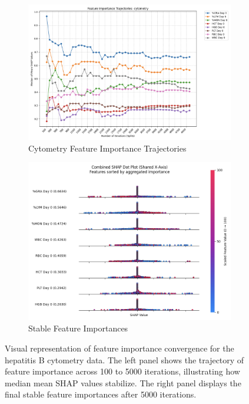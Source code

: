 \documentclass[12pt,a4paper]{report}
\begin{document}
\begin{figure}[h!]
    \centering
    
    \begin{subfigure}[b]{0.48\textwidth}
    \centering
    \includegraphics[width=\textwidth]{images/trajectory_cytometry_hepatitis.png}
    \caption{Cytometry Feature Importance Trajectories}
    \label{fig:trajectory_cytometry_hepatitis}
    \end{subfigure}
    \hfill
    \begin{subfigure}[b]{0.48\textwidth}
    \centering
    \includegraphics[width=\textwidth]{images/stable_features_cytometry_hepatitis.png}
    \caption{Stable Feature Importances}
    \label{fig:stable_features_cytometry_hepatitis}
    \end{subfigure}
    
    \caption[Hepatitis B Feature Importance Convergence]{Visual representation of feature importance convergence for the hepatitis B cytometry data. The left panel shows the trajectory of feature importance across 100 to 5000 iterations, illustrating how median mean SHAP values stabilize. The right panel displays the final stable feature importances after 5000 iterations.}
    \label{fig:feature_trajectories_plots_hepatitis}
\end{figure}
\end{document}
